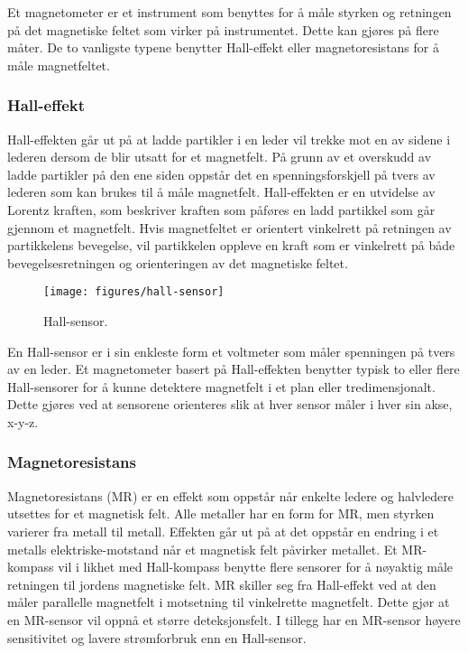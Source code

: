 Et magnetometer er et instrument som benyttes for å måle styrken og retningen på det magnetiske feltet som virker på instrumentet. 
Dette kan gjøres på flere måter. De to vanligste typene benytter Hall-effekt eller magnetoresistans for å måle magnetfeltet. \parencite{Skaar2021} 

\subsubsection{Hall-effekt}
Hall-effekten går ut på at ladde partikler i en leder vil trekke mot en av sidene i lederen dersom de blir utsatt for et magnetfelt. 
På grunn av et overskudd av ladde partikler på den ene siden oppstår det en spenningsforskjell på tvers av lederen som 
kan brukes til å måle magnetfelt. Hall-effekten er en utvidelse av Lorentz kraften, som beskriver kraften som påføres en 
ladd partikkel som går gjennom et magnetfelt. Hvis magnetfeltet er orientert vinkelrett på retningen av partikkelens bevegelse, 
vil partikkelen oppleve en kraft som er vinkelrett på både bevegelsesretningen og orienteringen av det magnetiske feltet. \parencite{Keim2015}

\begin{figure}[htp]
\centering
\texttt{[image: figures/hall-sensor]}
\caption{Hall-sensor. \parencite{Bosch}}
\label{fig:hall-sensor}
\end{figure}

En Hall-sensor er i sin enkleste form et voltmeter som måler spenningen på tvers av en leder. 
Et magnetometer basert på Hall-effekten benytter typisk to eller flere Hall-sensorer for å kunne 
detektere magnetfelt i et plan eller tredimensjonalt. Dette gjøres ved at sensorene orienteres slik 
at hver sensor måler i hver sin akse, x-y-z. 

\subsubsection{Magnetoresistans}
Magnetoresistans (MR) er en effekt som oppstår når enkelte ledere og halvledere utsettes for et magnetisk felt. 
Alle metaller har en form for MR, men styrken varierer fra metall til metall. 
Effekten går ut på at det oppstår en endring i et metalls elektriske-motstand når et magnetisk felt påvirker metallet. 
Et MR-kompass vil i likhet med Hall-kompass benytte flere sensorer for å nøyaktig måle retningen til jordens magnetiske felt.
MR skiller seg fra Hall-effekt ved at den måler parallelle magnetfelt i motsetning til vinkelrette magnetfelt. 
Dette gjør at en MR-sensor vil oppnå et større deteksjonsfelt. 
I tillegg har en MR-sensor høyere sensitivitet og lavere strømforbruk enn en Hall-sensor. \parencite{ROHM}

